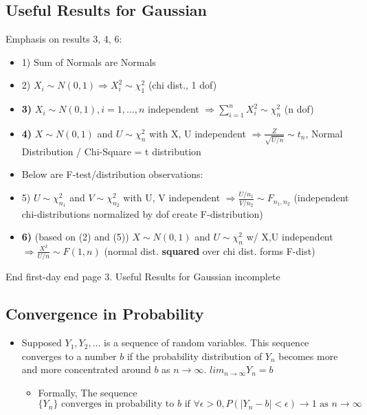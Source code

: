 \documentclass[10pt, oneside]{article}
\begin{document}
\subsection{Useful Results for Gaussian}
Emphasis on results 3, 4, 6:
\begin{itemize}
    \item 1) Sum of Normals are Normals
    \item 2) $X_i \sim N(0,1) \Rightarrow X_i^2 \sim \chi_1^2$ (chi dist., 1 dof)
    \item \textbf{3)} $X_i \sim N(0,1), i=1,...,n$ independent $\Rightarrow \sum_{i=1}^n X_i^2 \sim \chi_n^2$ (n dof)
    \item \textbf{4)} $X\sim N(0,1)$ and $U\sim \chi_n^2$ with X, U independent $\Rightarrow \frac{Z}{\sqrt{U/n}} \sim t_n$, Normal Distribution / Chi-Square = t distribution
    \item Below are F-test/distribution observations:
    \item 5) $U\sim \chi_{n_1}^2$ and $V\sim \chi_{n_2}^2$ with U, V independent $\Rightarrow \frac{U/n_1}{V/n_2} \sim F_{n_1, n_2}$ (independent chi-distributions normalized by dof create F-distribution)
    \item \textbf{6)} (based on (2) and (5)) $X\sim N(0,1)$ and $U\sim \chi_n^2$ w/ X,U independent $\Rightarrow \frac{X^2}{U/n}\sim F(1,n)$ (normal dist. \textbf{squared} over chi dist. forms F-dist)
\end{itemize}


End first-day end page 3. Useful Results for Gaussian incomplete

\subsection{Convergence in Probability}
\begin{itemize}
    \item Supposed $Y_1, Y_2,...$ is a sequence of random variables. This sequence converges to a number $b$ if the probability distribution of $Y_n$ becomes more and more concentrated around $b$ as $n\rightarrow \infty$. $lim_{n\rightarrow \infty} Y_n = b$
    \begin{itemize}
        \item Formally, The sequence $\{Y_n\} \text{ converges in probability to } b \text{ if }\forall \epsilon > 0, P(|Y_n-b| < \epsilon) \rightarrow 1 \text{ as } n\rightarrow \infty$
    \end{itemize}
\end{itemize}
\end{document}
